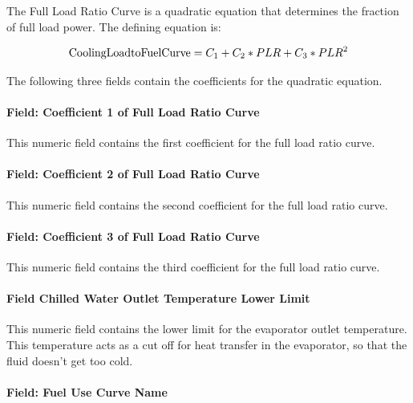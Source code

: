 The Full Load Ratio Curve is a quadratic equation that determines the fraction of full load power. The defining equation is:

\begin{equation}
{\rm{CoolingLoadtoFuelCurve}}
    = {C_1} + {C_2} * PLR + {C_3} * PL{R^2}
\end{equation}

The following three fields contain the coefficients for the quadratic equation.

\paragraph{Field: Coefficient 1 of Full Load Ratio Curve}\label{field-coefficient-1-of-full-load-ratio-curve-1}

This numeric field contains the first coefficient for the full load ratio curve.

\paragraph{Field: Coefficient 2 of Full Load Ratio Curve}\label{field-coefficient-2-of-full-load-ratio-curve-1}

This numeric field contains the second coefficient for the full load ratio curve.

\paragraph{Field: Coefficient 3 of Full Load Ratio Curve}\label{field-coefficient-3-of-full-load-ratio-curve-1}

This numeric field contains the third coefficient for the full load ratio curve.

\paragraph{Field Chilled Water Outlet Temperature Lower Limit}\label{field-chilled-water-outlet-temperature-lower-limit-3}

This numeric field contains the lower limit for the evaporator outlet temperature. This temperature acts as a cut off for heat transfer in the evaporator, so that the fluid doesn't get too cold.

\paragraph{Field: Fuel Use Curve Name}\label{field-fuel-use-curve-name}


